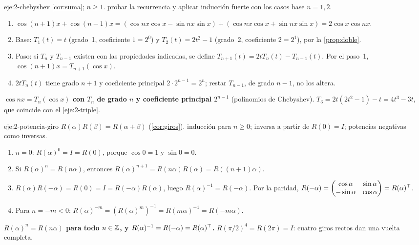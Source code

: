 \begin{solucion}{eje:2-chebyshev}
\datos \cref{cor:suma}; $n\ge1$.
\planteamiento probar la recurrencia y aplicar inducción fuerte con los casos base $n=1,2$.
\pasos
\begin{enumerate}[label=\arabic*.]
  \item $\cos(n+1)x+\cos(n-1)x=(\cos nx\cos x-\sin nx\sin x)+(\cos nx\cos x+\sin nx\sin x)=2\cos x\cos nx$.
  \item Base: $T_1(t)=t$ (grado~1, coeficiente $1=2^{0}$) y $T_2(t)=2t^{2}-1$ (grado~2, coeficiente $2=2^{1}$), por la \cref{prop:doble}.
  \item Paso: si $T_n$ y $T_{n-1}$ existen con las propiedades indicadas, se define $T_{n+1}(t)=2tT_n(t)-T_{n-1}(t)$. Por el paso~1, $\cos(n+1)x=T_{n+1}(\cos x)$.
  \item $2tT_n(t)$ tiene grado $n+1$ y coeficiente principal $2\cdot2^{n-1}=2^{n}$; restar $T_{n-1}$, de grado $n-1$, no los altera.
\end{enumerate}
\resultado \textbf{$\cos nx=T_n(\cos x)$ con $T_n$ de grado $n$ y coeficiente principal $2^{n-1}$} (polinomios de Chebyshev).
\comprobacion $T_3=2t(2t^{2}-1)-t=4t^{3}-3t$, que coincide con el \cref{eje:2-triple}.
\end{solucion}

\begin{solucion}{eje:2-potencia-giro}
\datos $R(\alpha)R(\beta)=R(\alpha+\beta)$ (\cref{cor:giros}).
\planteamiento inducción para $n\ge0$; inversa a partir de $R(0)=I$; potencias negativas como inversas.
\pasos
\begin{enumerate}[label=\arabic*.]
  \item $n=0$: $R(\alpha)^{0}=I=R(0)$, porque $\cos0=1$ y $\sin0=0$.
  \item Si $R(\alpha)^{n}=R(n\alpha)$, entonces $R(\alpha)^{n+1}=R(n\alpha)R(\alpha)=R((n+1)\alpha)$.
  \item $R(\alpha)R(-\alpha)=R(0)=I=R(-\alpha)R(\alpha)$, luego $R(\alpha)^{-1}=R(-\alpha)$. Por la paridad, $R(-\alpha)=\begin{pmatrix}\cos\alpha&\sin\alpha\\-\sin\alpha&\cos\alpha\end{pmatrix}=R(\alpha)^{\top}$.
  \item Para $n=-m<0$: $R(\alpha)^{-m}=(R(\alpha)^{m})^{-1}=R(m\alpha)^{-1}=R(-m\alpha)$.
\end{enumerate}
\resultado \textbf{$R(\alpha)^{n}=R(n\alpha)$ para todo $n\in\mathbb{Z}$, y $R(\alpha)^{-1}=R(-\alpha)=R(\alpha)^{\top}$.}
\comprobacion $R(\pi/2)^{4}=R(2\pi)=I$: cuatro giros rectos dan una vuelta completa.
\end{solucion}

